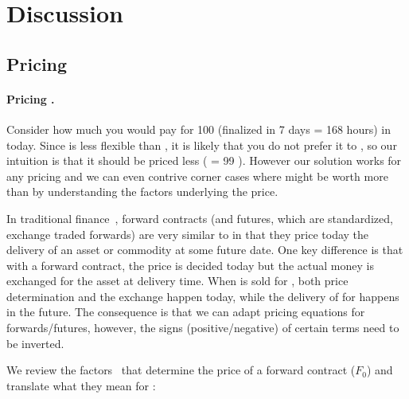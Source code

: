 
\section{Discussion}

\subsection{Pricing}  
\label{sec:pricing}

\paragraph{Pricing \ethxx.}

Consider how much you would pay for 100 \ethxx (finalized in 7 days = 168 hours) in \ethone today. Since \ethxx is less flexible than \ethone, it is likely that you do not prefer it to \ethone, so our intuition is that it should be priced less ( \ethxx = 99 \ethone). However our solution works for any pricing and we can even contrive corner cases where \ethxx might be worth more than \ethone by understanding the factors underlying the price. 

In traditional finance~\cite{hull2013fundamentals}, forward contracts (and futures, which are standardized, exchange traded forwards) are very similar to \ethxx in that they price today the delivery of an asset or commodity at some future date. One key difference is that with a forward contract, the price is decided today but the actual money is exchanged for the asset at delivery time. When \ethxx is sold for \ethone, both price determination and the exchange happen today, while the delivery of \ethone for \ethxx happens in the future. The consequence is that we can adapt pricing equations for forwards/futures, however, the signs (positive/negative) of certain terms need to be inverted. 

We review the factors~\cite{hull2013fundamentals} that determine the price of a forward contract ($F_0$) and translate what they mean for \ethxx:

